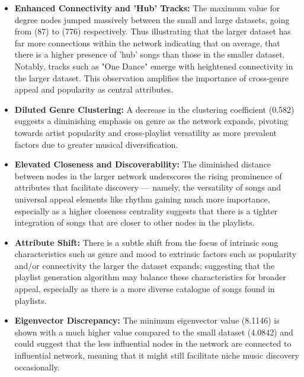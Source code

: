 \documentclass[conference]{IEEEtran}
\begin{document}
\begin{itemize}
    \item\textbf{Enhanced Connectivity and 'Hub' Tracks:} The maximum value for degree nodes jumped massively between the small and large datasets, going from (87) to (776) respectively. Thus illustrating that the larger dataset has far more connections within the network indicating that on average, that there is a higher presence of 'hub' songs than those in the smaller dataset. Notably, tracks such as "One Dance" emerge with heightened connectivity in the larger dataset. This observation amplifies the importance of cross-genre appeal and popularity as central attributes.
    
    \item\textbf{Diluted Genre Clustering:} A decrease in the clustering coefficient (0.582) suggests a diminishing emphasis on genre as the network expands, pivoting towards artist popularity and cross-playlist versatility as more prevalent factors due to greater musical diversification. \\
    
    \item\textbf{Elevated Closeness and Discoverability:} The diminished distance between nodes in the larger network underscores the rising prominence of attributes that facilitate discovery — namely, the versatility of songs and universal appeal elements like rhythm gaining much more importance, especially as a higher closeness centrality suggests that there is a tighter integration of songs that are closer to other nodes in the playlists. \\
    
    \item\textbf{Attribute Shift:} There is a subtle shift from the focus of intrinsic song characteristics such as genre and mood to extrinsic factors such as popularity and/or connectivity the larger the dataset expands; suggesting that the playlist generation algorithm may balance these characteristics for broader appeal, especially as there is a more diverse catalogue of songs found in playlists. \\

    \item\textbf{Eigenvector Discrepancy:} The minimum eigenvector value (8.1146) is shown with a much higher value compared to the small dataset (4.0842) and could suggest that the less influential nodes in the network are connected to influential network, meaning that it might still facilitate niche music discovery occasionally.
\end{itemize}
\end{document}
